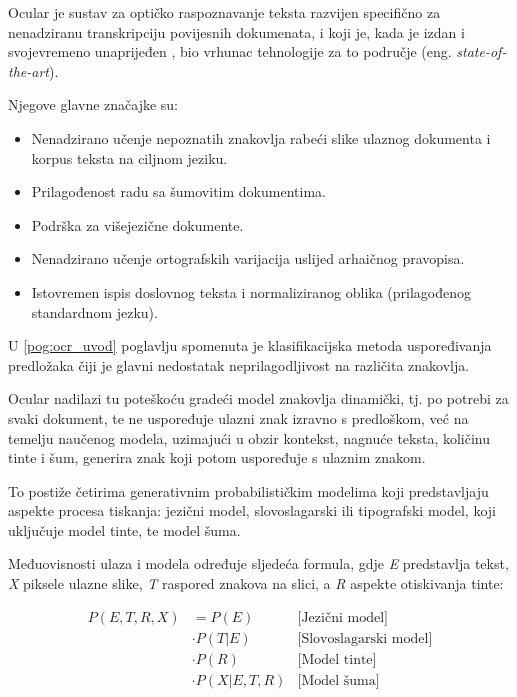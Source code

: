 \documentclass[zavrsnirad]{fer}
\begin{document}
Ocular \cite{Berg2013} je sustav za optičko raspoznavanje teksta razvijen specifično za nenadziranu transkripciju povijesnih dokumenata, i koji je, kada je izdan i svojevremeno unaprijeđen \cite{Berg2014}, bio vrhunac tehnologije za to područje (eng. \textit{state-of-the-art}).

Njegove glavne značajke su: \cite{Ocular}

\begin{itemize}
	\item Nenadzirano učenje nepoznatih znakovlja rabeći slike ulaznog dokumenta i korpus teksta na ciljnom jeziku.
	\item Prilagođenost radu sa šumovitim dokumentima.
	\item Podrška za višejezične dokumente.
	\item Nenadzirano učenje ortografskih varijacija uslijed arhaičnog pravopisa.
	\item Istovremen ispis doslovnog teksta i normaliziranog oblika (prilagođenog standardnom jezku).
\end{itemize}

U \ref{pog:ocr_uvod} poglavlju spomenuta je klasifikacijska metoda uspoređivanja predložaka čiji je glavni nedostatak neprilagodljivost na različita znakovlja.

Ocular nadilazi tu poteškoću gradeći model znakovlja dinamički, tj. po potrebi za svaki dokument, te ne uspoređuje ulazni znak izravno s predloškom, već na temelju naučenog modela, uzimajući u obzir kontekst, nagnuće teksta, količinu tinte i šum, generira znak koji potom uspoređuje s ulaznim znakom.

To postiže četirima generativnim probabilističkim modelima koji predstavljaju aspekte procesa tiskanja: jezični model, slovoslagarski ili tipografski model, koji uključuje model tinte, te model šuma.

Međuovisnosti ulaza i modela određuje sljedeća formula, \cite{Berg2013} gdje \textit{E} predstavlja tekst, \textit{X} piksele ulazne slike, \textit{T} raspored znakova na slici, a \textit{R} aspekte otiskivanja tinte:

\[
\begin{aligned}
	P(E, T, R, X) &= P(E) & \text{[Jezični model]} \\
	&\cdot P(T | E) & \text{[Slovoslagarski model]} \\
	&\cdot P(R) & \text{[Model tinte]} \\
	&\cdot P(X | E, T, R) & \text{[Model šuma]}
\end{aligned}
\]
\end{document}
